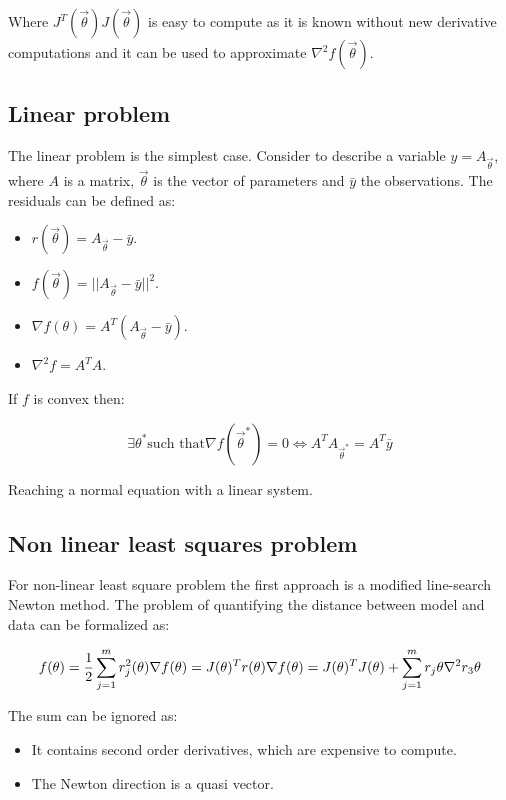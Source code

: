 Where $J^T(\vec{\theta})J(\vec{\theta})$ is easy to compute as it is known without new derivative computations and it can be used to approximate $\nabla^2f(\vec{\theta})$.

  \subsection{Linear problem}
  The linear problem is the simplest case.
  Consider to describe a variable $y = A_{\vec{\theta}}$, where $A$ is a matrix, $\vec{\theta}$ is the vector of parameters and $\bar{y}$ the observations.
  The residuals can be defined as:

  \begin{multicols}{2}
    \begin{itemize}
      \item $r(\vec{\theta})=A_{\vec{\theta}}-\bar{y}$.
      \item $f(\vec{\theta})= ||A_{\vec{\theta}}-\bar{y}||^2$.
      \item $\nabla f(\theta)=A^T(A_{\vec{\theta}}-\bar{y})$.
      \item $\nabla^2 f = A^TA$.
    \end{itemize}
  \end{multicols}

  If $f$ is convex then:

  $$\exists \theta^* \text{such that} \nabla f(\vec{\theta}^*)=0 \Leftrightarrow A^TA_{\vec{\theta}^*}=A^T\bar{y}$$

  Reaching a normal equation with a  linear system.

  \subsection{Non linear least squares problem}
  For non-linear least square problem the first approach is a modified line-search Newton method.
  The problem of quantifying the distance between model and data can be formalized as:

  $$f(\theta)= \frac{1}{2} \sum^m_{j=1} r_j^2 (\theta) \\ \nabla f(\theta) = J(\theta)^{T} r (\theta) \\ \nabla f(\theta) = J(\theta)^{T} J (\theta) + \sum^m_{j=1} r_j \theta \nabla^2 r_3 \theta$$

  The sum can be ignored as:

  \begin{multicols}{2}
    \begin{itemize}
      \item It contains second order derivatives, which are expensive to compute.
      \item The Newton direction is a quasi vector.
    \end{itemize}
  \end{multicols}

